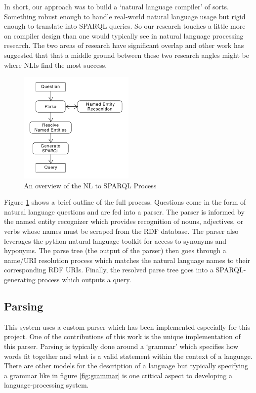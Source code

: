 \documentclass[11pt]{article}
\begin{document}
In short, our approach was to build a `natural language compiler' of sorts. Something
robust enough to handle real-world natural language usage but rigid enough to translate
into SPARQL queries. So our research touches a little more on compiler design than 
one would typically see in natural language processing research.
The two areas of research have significant 
overlap\cite{chomsky, reghizzi} and other work has suggested that that a middle ground 
between these two research angles might be where NLIs find the most success\cite{usability}.


\begin{figure}[h!]
    \centering
    \includegraphics[width=0.5\textwidth,natwidth=1,natheight=1]{umlet/usage.pdf}
    \caption{An overview of the NL to SPARQL Process}
    \label{fig:process}
\end{figure}

Figure \ref{fig:process} shows a brief outline of the full process. Questions come
in the form of natural language questions and are fed into a parser. The parser is
informed by the named entity recognizer which provides recognition of nouns, adjectives,
or verbs whose names must be scraped from the RDF database. The parser also 
leverages the python natural language toolkit\cite{nltk} for access to synonyms and
hyponyms. The parse tree (the output of the parser) then goes through a name/URI 
resolution process which matches the natural language names to their corresponding
RDF URIs. Finally, the resolved parse tree goes into a SPARQL-generating process 
which outputs a query.

\subsection{Parsing}

This system uses a custom parser which has been implemented especially for
this project. One of the contributions of this work is the unique implementation
of this parser. Parsing is typically done around a `grammar' which specifies how
words fit together and what is a valid statement within the context of a language.
There are other models for the description of a language\cite{chomsky} but
typically specifying a grammar like in figure \ref{fig:grammar} is one critical
aspect to developing a language-processing system.
\end{document}
